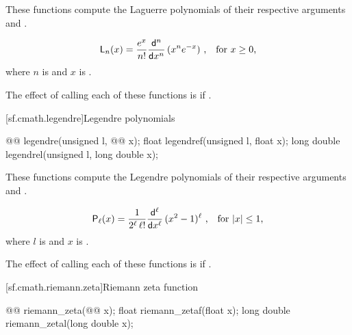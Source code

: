\begin{itemdescr}
\pnum
\effects
These functions compute the Laguerre polynomials
of their respective arguments
 and .

\pnum
\returns
\[ \mathsf{L}_n(x) =
     \frac{e^x}{n!} \frac{\mathsf{d}^n}{\mathsf{d}x^n} \, (x^n e^{-x})
     \text{ ,\quad for $x \ge 0$,} \]
where
$n$ is  and
$x$ is .

\pnum
\remarks
The effect of calling each of these functions
is 
if .
\end{itemdescr}

[sf.cmath.legendre]{Legendre polynomials}%
%
%
%
%
%
\begin{itemdecl}
@@ legendre(unsigned l, @@ x);
float        legendref(unsigned l, float x);
long double  legendrel(unsigned l, long double x);
\end{itemdecl}

\begin{itemdescr}
\pnum
\effects
These functions compute the Legendre polynomials of their
respective arguments
 and .

\pnum
\returns
\[ \mathsf{P}_\ell(x) =
     \frac{1}{2^\ell \, \ell!}
     \frac{\mathsf{d}^\ell}{\mathsf{d}x^\ell} \, (x^2 - 1) ^ \ell
     \text{ ,\quad for $|x| \le 1$,} \]
where
$l$ is  and
$x$ is .

\pnum
\remarks
The effect of calling each of these functions
is 
if .
\end{itemdescr}

[sf.cmath.riemann.zeta]{Riemann zeta function}%
%
%
%
%
\begin{itemdecl}
@@ riemann_zeta(@@ x);
float        riemann_zetaf(float x);
long double  riemann_zetal(long double x);
\end{itemdecl}

